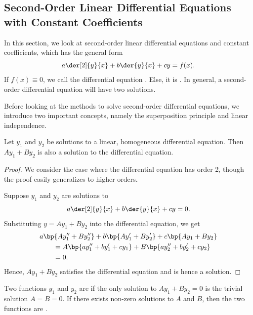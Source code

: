 \subsection{Second-Order Linear Differential Equations with Constant Coefficients}

In this section, we look at second-order linear differential equations and constant coefficients, which has the general form \[a \der[2]{y}{x} + b \der{y}{x} + cy = f(x).\] If $f(x) \equiv 0$, we call the differential equation . Else, it is . In general, a second-order differential equation will have two solutions.

Before looking at the methods to solve second-order differential equations, we introduce two important concepts, namely the superposition principle and linear independence.

\begin{theorem}
    Let $y_1$ and $y_2$ be solutions to a linear, homogeneous differential equation. Then $A y_1 + B y_2$ is also a solution to the differential equation.
\end{theorem}
\begin{proof}
    We consider the case where the differential equation has order 2, though the proof easily generalizes to higher orders.

    Suppose $y_1$ and $y_2$ are solutions to \[a \der[2]{y}{x} + b \der{y}{x} + c y = 0.\] Substituting $y = A y_1 + B y_2$ into the differential equation, we get
    \begin{align*}
        &a \bp{A y_1'' + By_2''} + b \bp{A y_1' + By_2'} + c\bp{Ay_1 + By_2}\\
        &\hspace{2em}= A\bp{ay_1'' + by_1' + cy_1} + B\bp{ay_2'' + by_2' + cy_2}\\
        &\hspace{2em}= 0.
    \end{align*}
    Hence, $A y_1 + By_2$ satisfies the differential equation and is hence a solution.
\end{proof}

\begin{definition}
    Two functions $y_1$ and $y_2$ are  if the only solution to $A y_1 + B y_2 = 0$ is the trivial solution $A = B = 0$. If there exists non-zero solutions to $A$ and $B$, then the two functions are .
\end{definition}

